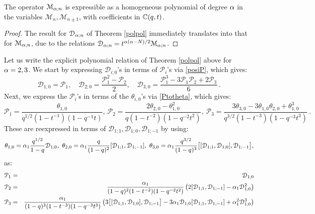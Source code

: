 \begin{cor}\label{polpolcor}
The operator ${\mathcal M}_{{\alpha};n}$ is expressible as a homogeneous polynomial of degree ${\alpha}$ in the variables
${\mathcal M}_{n},{\mathcal M}_{n\pm 1}$, with coefficients in ${\mathbb C}(q,t)$.
\end{cor}
\begin{proof}
The result for ${\mathcal D}_{{\alpha};n}$ of Theorem \ref{polpol}
immediately translates into that for ${\mathcal M}_{{\alpha};n}$, due to the relations
${\mathcal D}_{{\alpha};n}=t^{{\alpha}({\alpha}-N)/2}{\mathcal M}_{{\alpha};n}$.
\end{proof}

\begin{example}
Let us write the explicit polynomial relation of Theorem \ref{polpol} above for ${\alpha}=2,3$.
We start by expressing ${\mathcal D}_{i;0}$'s in terms of ${\mathcal P}_i$'s via \eqref{posiP}, which gives:
\begin{equation}\label{initexe}
 {\mathcal D}_{1;0}={\mathcal P}_1,\quad {\mathcal D}_{2;0}=\frac{{\mathcal P}_1^2-{\mathcal P}_2}{2},
\quad {\mathcal D}_{3;0}=\frac{{\mathcal P}_1^3-3 {\mathcal P}_1{\mathcal P}_2+2{\mathcal P}_3}{6} \ .
\end{equation}
Next, we express the ${\mathcal P}_i$'s in terms of the $\theta_{i,0}$'s via \eqref{Ptotheta}, which gives:
$${\mathcal P}_1=\frac{\theta_{1,0}}{q^{1/2}(1-t^{-1})(1-q^{-1}t)}, \ 
{\mathcal P}_2=\frac{2\theta_{2,0}-\theta_{1,0}^2}{q(1-t^{-2})(1-q^{-2}t^2)}, \ 
{\mathcal P}_3=\frac{3\theta_{3,0}-3\theta_{1,0}\theta_{2,0}+\theta_{1,0}^3}{q^{3/2}(1-t^{-3})(1-q^{-3}t^3)}\ .$$
These are reexpressed in terms of ${\mathcal D}_{1;1},{\mathcal D}_{1;0},{\mathcal D}_{1;-1}$ by using:
$$\theta_{1,0}=\al_1 \frac{q^{1/2}}{1-q}{\mathcal D}_{1;0}, \ 
\theta_{2,0}=\al_1  \frac{q}{(1-q)^2}[{\mathcal D}_{1;1},{\mathcal D}_{1;-1}],\ 
\theta_{3,0}=\al_1  \frac{q^{3/2}}{(1-q)^3}\big[ [{\mathcal D}_{1;1},{\mathcal D}_{1;0}],{\mathcal D}_{1;-1}\big],$$
as:
\begin{eqnarray*}
{\mathcal P}_1&=&{\mathcal D}_{1;0}\\
{\mathcal P}_2&=&\frac{{\alpha}_1}{(1-q)^2(1-t^{-2})(1-q^{-2}t^2)} 
\left(2 [{\mathcal D}_{1;1},{\mathcal D}_{1;-1}]
-{\alpha}_1 {\mathcal D}_{1;0}^2 \right)\\
{\mathcal P}_3&=&\frac{{\alpha}_1}{(1-q)^3(1-t^{-3})(1-q^{-3}t^3)}
\left(3\big[ [{\mathcal D}_{1;1},{\mathcal D}_{1;0}],{\mathcal D}_{1;-1}\big] -3{\alpha}_1{\mathcal D}_{1;0}[{\mathcal D}_{1;1},{\mathcal D}_{1;-1}] +{\alpha}_1^2 {\mathcal D}_{1;0}^3 \right)
\end{eqnarray*}

\end{example}
